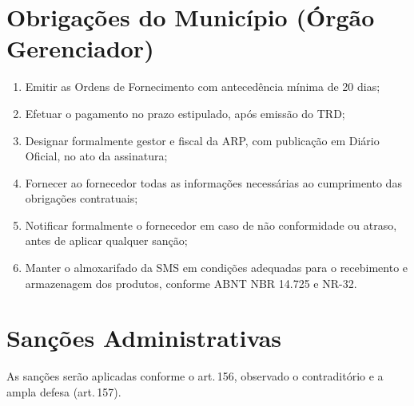\documentclass[12pt,a4paper]{article}
\newcommand{\art}[1]{art.\,#1}
\begin{document}
\section{Obrigações do Município (Órgão Gerenciador)}

\begin{enumerate}
  \item Emitir as Ordens de Fornecimento com antecedência mínima de 20 dias;
  \item Efetuar o pagamento no prazo estipulado, após emissão do TRD;
  \item Designar formalmente gestor e fiscal da ARP, com publicação em Diário Oficial,
    no ato da assinatura;
  \item Fornecer ao fornecedor todas as informações necessárias ao cumprimento
    das obrigações contratuais;
  \item Notificar formalmente o fornecedor em caso de não conformidade ou atraso,
    antes de aplicar qualquer sanção;
  \item Manter o almoxarifado da SMS em condições adequadas para o recebimento
    e armazenagem dos produtos, conforme ABNT NBR 14.725 e NR-32.
\end{enumerate}

\section{Sanções Administrativas}

\begin{legalbox}
\small As sanções serão aplicadas conforme o \art{156}, observado o contraditório
e a ampla defesa (\art{157}).
\end{legalbox}
\end{document}
